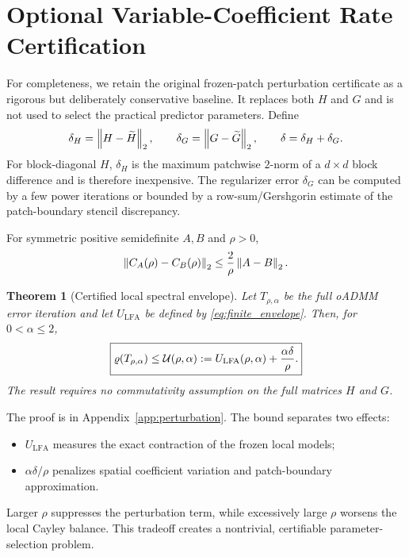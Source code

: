 \documentclass[pdflatex,iicol,sn-mathphys-num]{sn-jnl}
\newtheorem{theorem}{Theorem}[section]
\theoremstyle{definition}\newtheorem{definition}[theorem]{Definition}\newtheorem{remark}[theorem]{Remark}
\begin{document}
\section{Optional Variable-Coefficient Rate Certification}
\begingroup\small
For completeness, we retain the original frozen-patch perturbation certificate as a rigorous but deliberately conservative baseline. It replaces both $H$ and $G$ and is not used to select the practical predictor parameters. Define
\begin{equation}
\delta_H=\left\lVert H-\widetilde H\right\rVert_2,
\qquad
\delta_G=\left\lVert G-\widetilde G\right\rVert_2,
\qquad
\delta=\delta_H+\delta_G.
\label{eq:deltas}
\end{equation}
For block-diagonal $H$, $\delta_H$ is the maximum patchwise $2$-norm of a $d\times d$ block difference and is therefore inexpensive. The regularizer error $\delta_G$ can be computed by a few power iterations or bounded by a row-sum/Gershgorin estimate of the patch-boundary stencil discrepancy.

\begin{lemma}\label{lem:cayley_lipschitz}
For symmetric positive semidefinite $A,B$ and $\rho>0$,
\begin{equation}
\left\lVert C_A(\rho)-C_B(\rho)\right\rVert_2
\le\frac{2}{\rho}\left\lVert A-B\right\rVert_2.
\label{eq:cayley_lipschitz}
\end{equation}
\end{lemma}

\begin{theorem}[Certified local spectral envelope]\label{thm:certified}
Let $T_{\rho,\alpha}$ be the full oADMM error iteration and let $U_{\mathrm{LFA}}$ be defined by \eqref{eq:finite_envelope}. Then, for $0<\alpha\le2$,
\begin{equation}
\boxed{
\varrho(T_{\rho,\alpha})
\le
\mathcal U(\rho,\alpha)
:=U_{\mathrm{LFA}}(\rho,\alpha)
+\frac{\alpha\delta}{\rho}.
}
\label{eq:certified_envelope}
\end{equation}
The result requires no commutativity assumption on the full matrices $H$ and $G$.
\end{theorem}

The proof is in Appendix~\ref{app:perturbation}. The bound separates two effects:
\begin{itemize}[leftmargin=2em]
\item $U_{\mathrm{LFA}}$ measures the exact contraction of the frozen local models;
\item $\alpha\delta/\rho$ penalizes spatial coefficient variation and patch-boundary approximation.
\end{itemize}
Larger $\rho$ suppresses the perturbation term, while excessively large $\rho$ worsens the local Cayley balance. This tradeoff creates a nontrivial, certifiable parameter-selection problem.
\end{document}
